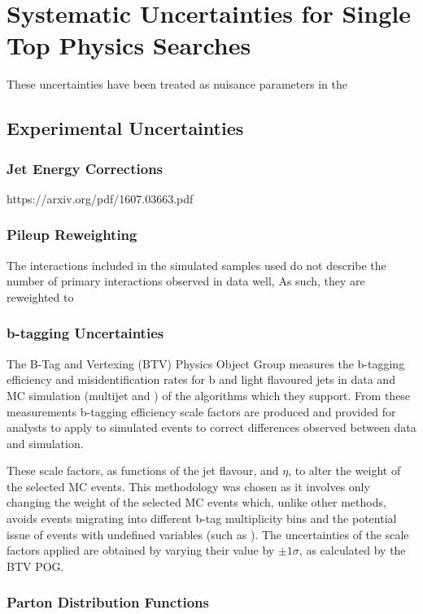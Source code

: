\chapter{Systematic Uncertainties for Single Top Physics Searches}\label{chapter:tzq-systematics}

These uncertainties have been treated as nuisance parameters in the 
\section{Experimental Uncertainties}
\subsection{Jet Energy Corrections}
https://arxiv.org/pdf/1607.03663.pdf
\subsection{Pileup Reweighting}
The \PU interactions included in the simulated samples used do not describe the number of primary interactions observed in data well, 
As such, they are reweighted to 

\subsection{b-tagging Uncertainties}
The B-Tag and Vertexing (BTV) Physics Object Group measures the b-tagging efficiency and misidentification rates for b and light flavoured jets in data and MC simulation (multijet and \ttbar) of the algorithms which they support.
From these measurements b-tagging efficiency scale factors are produced and provided for analysts to apply to simulated events to correct differences observed between data and simulation.

These scale factors, as functions of the jet flavour, \pT and $\eta$, to alter the weight of the selected MC events.
This methodology was chosen as it involves only changing the weight of the selected MC events which, unlike other methods, avoids events migrating into different b-tag multiplicity bins and the potential issue of events with undefined variables (such as ).
The uncertainties of the scale factors applied are obtained by varying their value by $\pm 1\sigma$, as calculated by the BTV POG. 

\subsection{Parton Distribution Functions}
